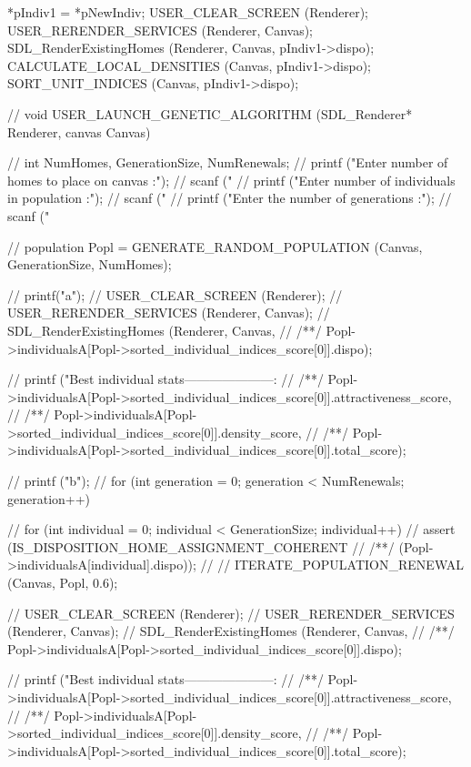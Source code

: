 \begin{C}
{	*pIndiv1 = *pNewIndiv;
	USER_CLEAR_SCREEN (Renderer);
	USER_RERENDER_SERVICES (Renderer, Canvas);
	SDL_RenderExistingHomes (Renderer, Canvas, pIndiv1->dispo);
	CALCULATE_LOCAL_DENSITIES (Canvas, pIndiv1->dispo);
	SORT_UNIT_INDICES (Canvas, pIndiv1->dispo);
}

// void USER_LAUNCH_GENETIC_ALGORITHM (SDL_Renderer* Renderer, canvas Canvas){
	
	// 	int NumHomes, GenerationSize, NumRenewals;
	// 	printf ("Enter number of homes to place on canvas :\n");
	// 	scanf ("%
	// 	printf ("Enter number of individuals in population :\n");
	// 	scanf ("%
	// 	printf ("Enter the number of generations :\n");
	// 	scanf ("%
	
	// 	population Popl = GENERATE_RANDOM_POPULATION (Canvas, GenerationSize, NumHomes);
	
	// 	printf("a\n");
	// 	USER_CLEAR_SCREEN (Renderer);
	// 	USER_RERENDER_SERVICES (Renderer, Canvas);
	// 	SDL_RenderExistingHomes (Renderer, Canvas,
	// 	/**/ Popl->individualsA[Popl->sorted_individual_indices_score[0]].dispo);
	
	// 	printf ("Best individual stats\n---------------------\nAttractiveness : %
	// 	/**/ Popl->individualsA[Popl->sorted_individual_indices_score[0]].attractiveness_score,
	// 	/**/ Popl->individualsA[Popl->sorted_individual_indices_score[0]].density_score,
	// 	/**/ Popl->individualsA[Popl->sorted_individual_indices_score[0]].total_score);
	
	// 	printf ("b\n");
	// 	for (int generation = 0; generation < NumRenewals; generation++){
		
		// 		for (int individual = 0; individual < GenerationSize; individual++){
			// 			assert (IS_DISPOSITION_HOME_ASSIGNMENT_COHERENT
			// 			/**/ (Popl->individualsA[individual].dispo));
			// 		}
		// 		ITERATE_POPULATION_RENEWAL (Canvas, Popl, 0.6);
		
		// 		USER_CLEAR_SCREEN (Renderer);
		// 		USER_RERENDER_SERVICES (Renderer, Canvas);
		// 		SDL_RenderExistingHomes (Renderer, Canvas,
		// 		/**/ Popl->individualsA[Popl->sorted_individual_indices_score[0]].dispo);
		
		// 		printf ("Best individual stats\n---------------------\nAttractiveness : %
		// 		/**/ Popl->individualsA[Popl->sorted_individual_indices_score[0]].attractiveness_score,
		// 		/**/ Popl->individualsA[Popl->sorted_individual_indices_score[0]].density_score,
		// 		/**/ Popl->individualsA[Popl->sorted_individual_indices_score[0]].total_score);
		
}}
\end{C}
